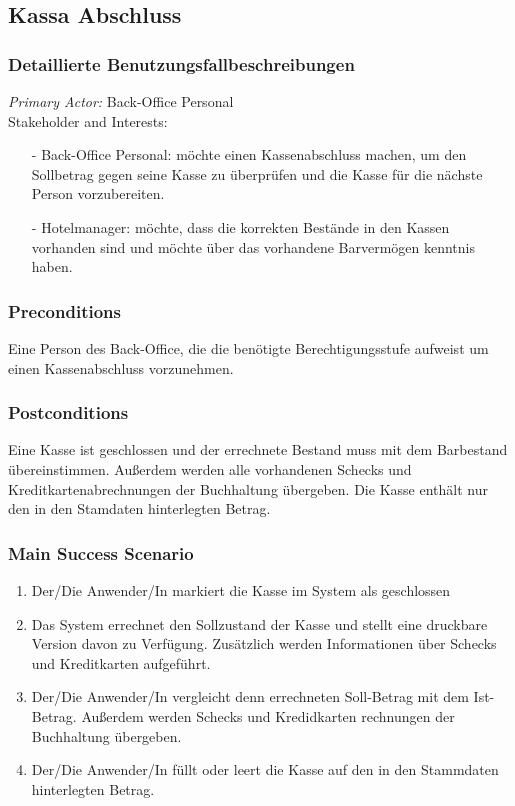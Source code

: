 \documentclass[./detailed_overview_usecases.tex]{subfiles}
\begin{document}
    \subsection{Kassa Abschluss}
    \subsubsection{Detaillierte Benutzungsfallbeschreibungen}
    \textit{Primary Actor:}
    Back-Office Personal
    \\
    Stakeholder and Interests:
    \begin{itemize}
        \item[-] Back-Office Personal: möchte einen Kassenabschluss
        machen, um den Sollbetrag gegen seine Kasse zu überprüfen und die Kasse für
        die nächste Person vorzubereiten.
        \item[-] Hotelmanager: möchte, dass die korrekten Bestände in
        den Kassen vorhanden sind und möchte über das vorhandene Barvermögen
        kenntnis haben.
    \end{itemize}

    \subsubsection*{Preconditions}
    Eine Person des Back-Office, die die benötigte Berechtigungsstufe
    aufweist um einen Kassenabschluss vorzunehmen.

    \subsubsection*{Postconditions}
    Eine Kasse ist geschlossen und der errechnete Bestand muss mit dem
    Barbestand übereinstimmen. Außerdem werden alle vorhandenen Schecks und
    Kreditkartenabrechnungen der Buchhaltung übergeben.
    Die Kasse enthält nur den in den Stamdaten hinterlegten Betrag.

    \subsubsection*{Main Success Scenario}
    \begin{enumerate}
        \item Der/Die Anwender/In markiert die Kasse im System als geschlossen
        \item Das System errechnet den Sollzustand der Kasse und stellt eine druckbare
        Version davon zu Verfügung. Zusätzlich werden Informationen über Schecks und Kreditkarten
        aufgeführt.
        \item Der/Die Anwender/In vergleicht denn errechneten Soll-Betrag mit dem
        Ist-Betrag. Außerdem werden Schecks und Kredidkarten rechnungen der Buchhaltung übergeben.
        \item Der/Die Anwender/In füllt oder leert die Kasse auf den in den Stammdaten hinterlegten Betrag.
    \end{enumerate}
\end{document}
